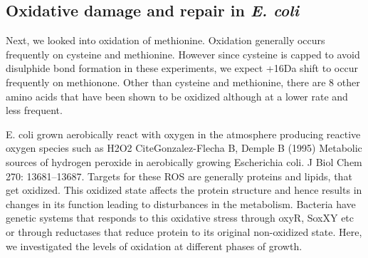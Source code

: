 \documentclass[12pt]{article}
\begin{document}
\subsection{Oxidative damage and repair in \emph{E. coli}}
%
%
%   
%   
%   
%
Next, we looked into oxidation of methionine. Oxidation generally occurs frequently on cysteine and methionine. However since cysteine is capped to avoid disulphide bond formation in these experiments, we expect +16Da shift to occur frequently on methionone. Other than cysteine and methionine, there are 8 other amino acids that have been shown to be oxidized although at a lower rate and less frequent. 

E. coli grown aerobically react with oxygen in the atmosphere producing reactive oxygen species such as H2O2 {CiteGonzalez-Flecha B, Demple B (1995) Metabolic sources of hydrogen peroxide in aerobically growing Escherichia coli. J Biol Chem 270: 13681–13687}. Targets for these ROS are generally proteins and lipids, that get oxidized. This oxidized state affects the protein structure and hence results in changes in its function leading to disturbances in the metabolism. Bacteria have genetic systems that responds to this oxidative stress through oxyR, SoxXY etc or through reductases that reduce protein to its original non-oxidized state. Here, we investigated the levels of oxidation at different phases of growth.
\end{document}
